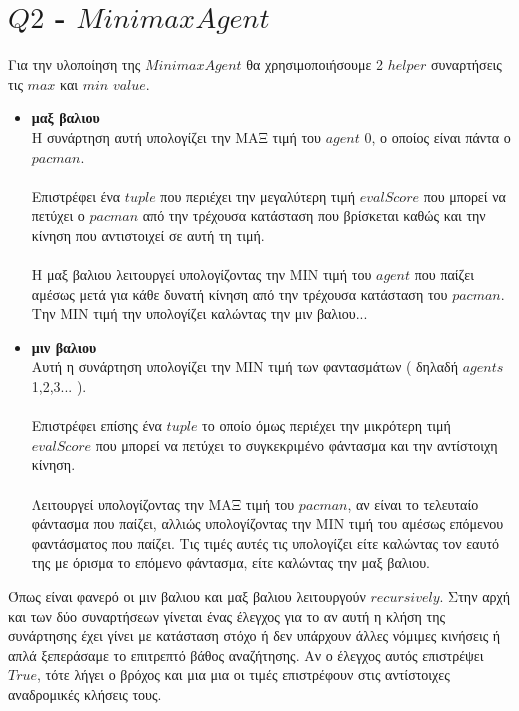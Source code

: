 \documentclass[12pt]{article}
\begin{document}
\section*{$Q2$ - $MinimaxAgent$}
Για την υλοποίηση της $MinimaxAgent$ θα χρησιμοποιήσουμε 2 $helper$ συναρτήσεις τις $max$ και $min$ $value$.
\begin{itemize}
    \item \textbf{μαξ βαλιου} \\Η συνάρτηση αυτή υπολογίζει την ΜΑΞ τιμή του $agent$ 0, ο οποίος είναι πάντα ο $pacman$.
    \\\\Επιστρέφει ένα $tuple$ που περιέχει την μεγαλύτερη τιμή $evalScore$ που μπορεί να πετύχει ο $pacman$ από την τρέχουσα κατάσταση που βρίσκεται καθώς και την κίνηση που αντιστοιχεί σε αυτή τη τιμή.\\\\
    Η μαξ βαλιου λειτουργεί υπολογίζοντας την ΜΙΝ τιμή του $agent$ που παίζει αμέσως μετά για κάθε δυνατή κίνηση από την τρέχουσα κατάσταση του $pacman$. Την ΜΙΝ τιμή την υπολογίζει καλώντας την μιν βαλιου...
    \item \textbf{μιν βαλιου}\\
    Αυτή η συνάρτηση υπολογίζει την ΜΙΝ τιμή των φαντασμάτων ( δηλαδή $agents$ 1,2,3... ).\\\\
    Επιστρέφει επίσης ένα $tuple$ το οποίο όμως περιέχει την μικρότερη τιμή $evalScore$ που μπορεί να πετύχει το συγκεκριμένο φάντασμα και την αντίστοιχη κίνηση.\\\\
    Λειτουργεί υπολογίζοντας την ΜΑΞ τιμή του $pacman$, αν είναι το τελευταίο φάντασμα που παίζει, αλλιώς υπολογίζοντας την ΜΙΝ τιμή του αμέσως επόμενου φαντάσματος που παίζει. Τις τιμές αυτές τις υπολογίζει είτε καλώντας τον εαυτό της με όρισμα το επόμενο φάντασμα, είτε καλώντας την μαξ βαλιου.
\end{itemize}
Όπως είναι φανερό οι μιν βαλιου και μαξ βαλιου λειτουργούν $recursively$. Στην αρχή και των δύο συναρτήσεων γίνεται ένας έλεγχος για το αν αυτή η κλήση της συνάρτησης έχει γίνει με κατάσταση στόχο ή δεν υπάρχουν άλλες νόμιμες κινήσεις ή απλά ξεπεράσαμε το επιτρεπτό βάθος αναζήτησης. Αν ο έλεγχος αυτός επιστρέψει $True$, τότε λήγει ο βρόχος και μια μια οι τιμές επιστρέφουν στις αντίστοιχες αναδρομικές κλήσεις τους.
\end{document}
